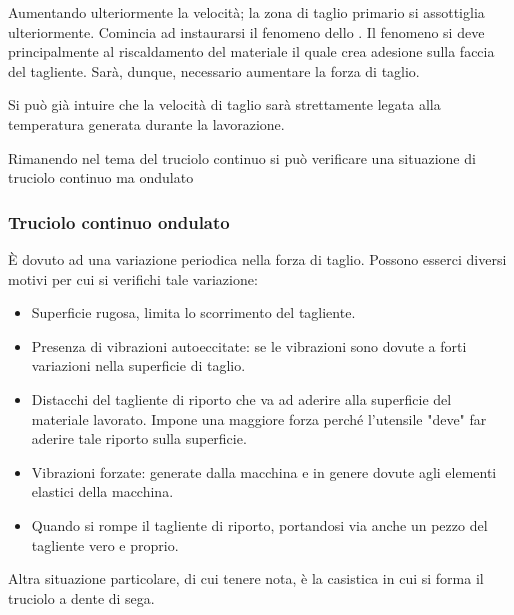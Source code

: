 Aumentando ulteriormente la velocità; la zona di taglio primario si assottiglia ulteriormente.
Comincia ad instaurarsi il fenomeno dello .
Il fenomeno si deve principalmente al riscaldamento
del materiale il quale crea adesione sulla faccia del
tagliente. Sarà, dunque, necessario aumentare la 
forza di taglio.

Si può già intuire che la velocità di taglio sarà 
strettamente legata alla temperatura generata durante la lavorazione.

Rimanendo nel tema del truciolo continuo si può verificare una situazione di truciolo continuo ma
ondulato

\subsubsection{Truciolo continuo ondulato}
È dovuto ad una variazione periodica nella forza di taglio. Possono esserci diversi motivi per cui 
si verifichi tale variazione: 
\begin{itemize}
\item Superficie rugosa, limita lo scorrimento del
tagliente.
\item Presenza di vibrazioni autoeccitate: se le vibrazioni sono dovute a forti variazioni nella superficie di taglio.
\item Distacchi del tagliente di riporto che va ad aderire alla superficie del materiale lavorato. 
Impone una maggiore forza perché l'utensile "deve"
far aderire tale riporto sulla superficie.
\item Vibrazioni forzate: generate dalla macchina 
e in genere dovute agli elementi elastici della macchina.
\item Quando si rompe il tagliente di riporto, portandosi via anche un pezzo del tagliente vero
e proprio.
\end{itemize}

Altra situazione particolare, di cui tenere nota, è la casistica in cui si forma il truciolo a dente di sega.

